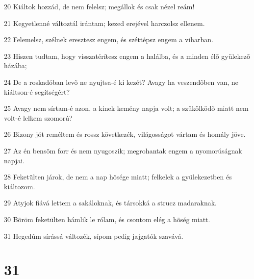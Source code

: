 \par 20 Kiáltok hozzád, de nem felelsz; megállok és csak nézel reám!
\par 21 Kegyetlenné változtál irántam; kezed erejével harczolsz ellenem.
\par 22 Felemelsz, szélnek eresztesz engem, és széttépsz engem a viharban.
\par 23 Hiszen tudtam, hogy visszatérítesz engem a halálba, és a minden élõ gyülekezõ házába;
\par 24 De a roskadóban levõ ne nyujtsa-é ki kezét? Avagy ha veszendõben van, ne kiáltson-é segítségért?
\par 25 Avagy nem sírtam-é azon, a kinek kemény napja volt; a szûkölködõ miatt nem volt-é lelkem szomorú?
\par 26 Bizony jót reméltem és rossz következék, világosságot vártam és homály jöve.
\par 27 Az én bensõm forr és nem nyugoszik; megrohantak engem a nyomorúságnak napjai.
\par 28 Feketülten járok, de nem a nap hõsége miatt; felkelek a gyülekezetben és kiáltozom.
\par 29 Atyjok fiává lettem a sakáloknak, és társokká a strucz madaraknak.
\par 30 Bõröm feketülten hámlik le rólam, és csontom elég a hõség miatt.
\par 31 Hegedûm sírássá változék, sípom pedig jajgatók szavává.

\chapter{31}

